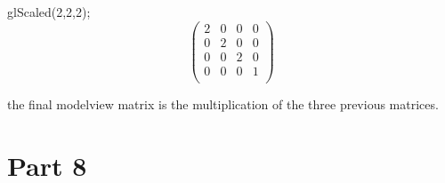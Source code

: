 glScaled(2,2,2);
$$\begin{pmatrix}
	2&	0& 	0&	0\\
	0&	2&	0&	0\\
	0&	0&	2&	0\\
	0&	0&	0&	1\\
\end{pmatrix}$$

the final modelview matrix is the multiplication of the three previous matrices.


\section{Part 8}


